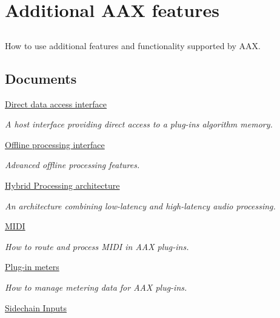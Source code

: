 \hypertarget{a00332}{}\section{Additional A\+A\+X features}
\label{a00332}


\subsection{ }
How to use additional features and functionality supported by A\+A\+X. 

\subsection*{Documents}
\begin{DoxyCompactItemize}
\item 
\hyperlink{a00333}{Direct data access interface}
\begin{DoxyCompactList}\small\item\em A host interface providing direct access to a plug-\/in\textquotesingle{}s algorithm memory. \end{DoxyCompactList}\item 
\hyperlink{a00334}{Offline processing interface}
\begin{DoxyCompactList}\small\item\em Advanced offline processing features. \end{DoxyCompactList}\item 
\hyperlink{a00335}{Hybrid Processing architecture}
\begin{DoxyCompactList}\small\item\em An architecture combining low-\/latency and high-\/latency audio processing. \end{DoxyCompactList}\item 
\hyperlink{a00336}{M\+I\+D\+I}
\begin{DoxyCompactList}\small\item\em How to route and process M\+I\+D\+I in A\+A\+X plug-\/ins. \end{DoxyCompactList}\item 
\hyperlink{a00337}{Plug-\/in meters}
\begin{DoxyCompactList}\small\item\em How to manage metering data for A\+A\+X plug-\/ins. \end{DoxyCompactList}\item 
\hyperlink{a00338}{Sidechain Inputs}

\end{DoxyCompactItemize}
